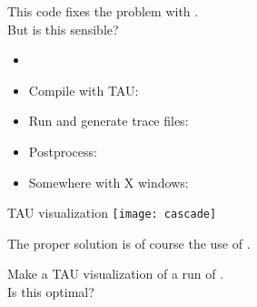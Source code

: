 \documentclass[11pt,headernav]{beamer}
\begin{document}
\begin{exerciseframe}[sendrecv2]
  This code fixes the problem with .\\
  But is this sensible?

  \begin{itemize}
  \item {}
  \item Compile with TAU:\\
  \item Run and generate trace files:\\
  \item Postprocess:\\
  \item Somewhere with X windows:\\
  \end{itemize}
\end{exerciseframe}

\begin{frame}{TAU visualization}
  \texttt{[image: cascade]}
\end{frame}

\begin{exerciseframe}[isendrecv]
  The proper solution is of course the use of .

  Make a TAU visualization of a run of .\\
  Is this optimal?
\end{exerciseframe}
\end{document}
